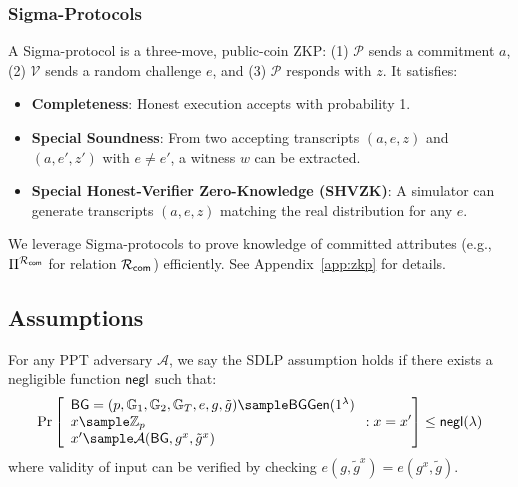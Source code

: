 \subsubsection{Sigma-Protocols}
A Sigma-protocol is a three-move, public-coin ZKP: (1) $\mathcal{P}$ sends a commitment $a$, (2) $\mathcal{V}$ sends a random challenge $e$, and (3) $\mathcal{P}$ responds with $z$. It satisfies:
\begin{itemize}
    \item \textbf{Completeness}: Honest execution accepts with probability 1.
    \item \textbf{Special Soundness}: From two accepting transcripts $(a, e, z)$ and $(a, e', z')$ with $e \neq e'$, a witness $w$ can be extracted.
    \item \textbf{Special Honest-Verifier Zero-Knowledge (SHVZK)}: A simulator can generate transcripts $(a, e, z)$ matching the real distribution for any $e$.
\end{itemize}
We leverage Sigma-protocols to prove knowledge of committed attributes (e.g., $\Pi^{\mathcal{R}_{\mathsf{com}}}$ for relation ${\mathcal{R}_{\mathsf{com}}}$) efficiently. See Appendix~\ref{app:zkp} for details.

\subsection{Assumptions}


\begin{definition}\label{sdlp}
For any PPT adversary $\mathcal{A}$, we say the SDLP assumption holds if there exists a negligible function $\mathsf{negl}$ such that:
$$\Pr\left[\begin{array}{l}
    \BG = (p, \G_1, \G_2, \G_T, e, g, \tilde{g}) \sample \BGGen(1^\lambda) \\
    x \sample \Z_p \\
    x' \sample \mathcal{A}(\BG, g^x, \tilde{g}^x)
\end{array} : x = x'\right] \leq \negl(\lambda)$$
where validity of input can be verified by checking $e(g, \tilde{g}^x) = e(g^x, \tilde{g})$.
\end{definition} 


